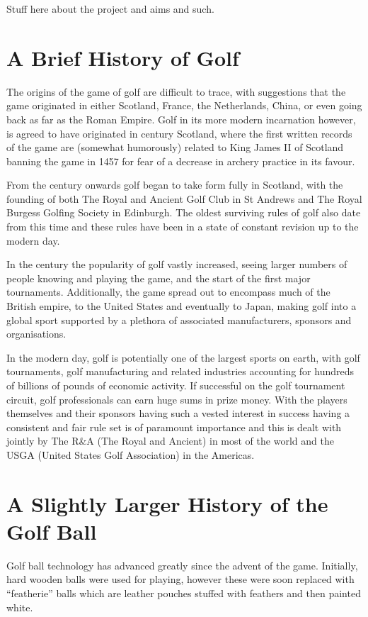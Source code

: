 Stuff here about the project and aims and such.

\section{A Brief History of Golf}

The origins of the game of golf are difficult to trace, with suggestions that the game originated
in either Scotland, France, the Netherlands, China, or even going back as far as the Roman Empire.
Golf in its more modern incarnation however, is agreed to have originated in  century
Scotland, where the first written records of the game are (somewhat humorously) related to
King James II of Scotland banning the game in 1457 for fear of a decrease in archery practice
in its favour.

From the  century onwards golf began to take form fully in Scotland, with the founding
of both The Royal and Ancient Golf Club in St Andrews and The Royal Burgess Golfing Society
in Edinburgh. The oldest surviving rules of golf also date from this time and these rules have been
in a state of constant revision up to the modern day.

In the  century the popularity of golf vastly increased, seeing larger numbers of people
knowing and playing the game, and the start of the first major tournaments. Additionally, the
game spread out to encompass much of the British empire, to the United States and eventually to
Japan, making golf into a global sport supported by a plethora of associated manufacturers, sponsors
and organisations.

In the modern day, golf is potentially one of the largest sports on earth, with golf tournaments,
golf manufacturing and related industries accounting for hundreds of billions of pounds of
economic activity. If successful on the golf tournament circuit, golf professionals can earn huge sums
in prize money. With the players themselves and their sponsors having such a vested interest in success
having a consistent and fair rule set is of paramount importance and this is dealt with jointly by 
The R\&A (The Royal and Ancient) in most of the world and the USGA (United States Golf Association) 
in the Americas.

\section{A Slightly Larger History of the Golf Ball}

Golf ball technology has advanced greatly since the advent of the game. Initially, hard wooden
balls were used for playing, however these were soon replaced with “featherie” balls which are
leather pouches stuffed with feathers and then painted white.

